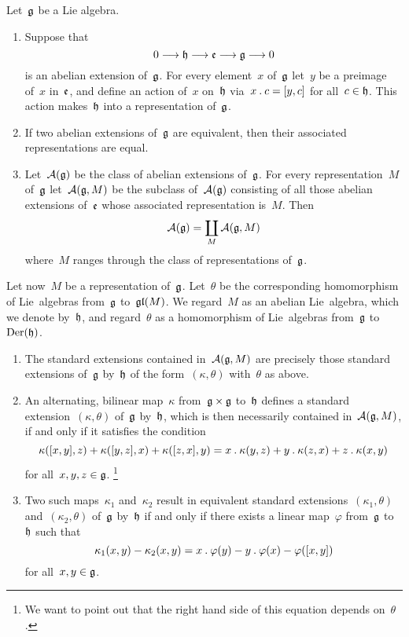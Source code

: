 \begin{theorem}
	\label{structure of abelian extensions}
	Let~$\mathfrak{g}$ be a Lie algebra.
	\begin{enumerate}
		\item
			Suppose that
			\[
				0
				\to
				\hlie
				\to
				\elie
				\to
				\glie
				\to
				0
			\]
			is an abelian extension of~$\mathfrak{g}$.
			For every element~$x$ of~$\mathfrak{g}$ let~$y$ be a preimage of~$x$ in~$\mathfrak{e}$, and define an action of~$x$ on~$\mathfrak{h}$ via~$x \mathbin{.} c = [y,c]$ for all~$c \in \mathfrak{h}$.
			This action makes~$\mathfrak{h}$ into a representation of~$\mathfrak{g}$.
		\item
			If two abelian extensions of~$\mathfrak{g}$ are equivalent, then their associated representations are equal.
		\item
			Let~$\mathcal{A}(\mathfrak{g})$ be the class of abelian extensions of~$\mathfrak{g}$.
			For every representation~$M$ of~$\mathfrak{g}$ let~$\mathcal{A}(\mathfrak{g}, M)$ be the subclass of~$\mathcal{A}(\mathfrak{g})$ consisting of all those abelian extensions of~$\mathfrak{e}$ whose associated representation is~$M$.
			Then
			\[
				\mathcal{A}(\mathfrak{g})
				=
				\coprod_M \mathcal{A}(\mathfrak{g}, M)
			\]
			where~$M$ ranges through the class of representations of~$\mathfrak{g}$.
	\end{enumerate}
	Let now~$M$ be a representation of~$\mathfrak{g}$.
	Let~$\theta$ be the corresponding homomorphism of Lie~algebras from~$\mathfrak{g}$ to~$\mathfrak{gl}(M)$.
	We regard~$M$ as an abelian Lie~algebra, which we denote by~$\mathfrak{h}$, and regard~$\theta$ as a homomorphism of Lie~algebras from~$\mathfrak{g}$ to~$\operatorname{Der}(\mathfrak{h})$.
	\begin{enumerate}[resume*]
		\item
			The standard extensions contained in~$\mathcal{A}(\mathfrak{g}, M)$ are precisely those standard extensions of~$\mathfrak{g}$ by~$\mathfrak{h}$ of the form~$(\kappa, \theta)$ with~$\theta$ as above.
		\item
			An alternating, bilinear map~$\kappa$ from~$\mathfrak{g} \times \mathfrak{g}$ to~$\mathfrak{h}$ defines a standard extension~$(\kappa, \theta)$ of~$\mathfrak{g}$ by~$\mathfrak{h}$, which is then necessarily contained in~$\mathcal{A}(\mathfrak{g}, M)$, if and only if it satisfies the condition
			\[
				\kappa( [x,y], z ) + \kappa( [y,z], x ) + \kappa( [z,x], y )
				=
				x \mathbin{.} \kappa(y,z) + y \mathbin{.} \kappa(z,x) + z \mathbin{.} \kappa(x,y)
			\]
			for all~$x, y, z \in \mathfrak{g}$.%
			\footnote{
				We want to point out that the right hand side of this equation depends on~$\theta$.
			}
		\item
			Two such maps~$\kappa_1$ and~$\kappa_2$ result in equivalent standard extensions~$(\kappa_1, \theta)$ and~$(\kappa_2, \theta)$ of~$\mathfrak{g}$ by~$\mathfrak{h}$ if and only if there exists a linear map~$\varphi$ from~$\mathfrak{g}$ to~$\mathfrak{h}$ such that
			\[
				\kappa_1(x,y)
				- \kappa_2(x,y)
				=
				x \mathbin{.} \varphi(y)
				- y \mathbin{.} \varphi(x)
				- \varphi( [x,y] )
			\]
			for all~$x, y \in \mathfrak{g}$.
	\end{enumerate}
\end{theorem}


